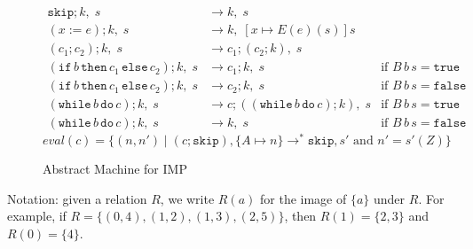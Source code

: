 \documentclass{tufte-handout}
\newcommand{\ASSIGN}[2]{#1 \mathrel{:=} #2}
\newcommand{\SEQ}[2]{#1 \mathrel{;} #2}
\newcommand{\SKIP}[0]{\mathtt{skip}}
\newcommand{\IF}[3]{\mathtt{if}\,#1\,\mathtt{then}\,#2\,\mathtt{else}\,#3}
\newcommand{\WHILE}[2]{\mathtt{while}\,#1\,\mathtt{do}\,#2}
\newcommand{\TRUE}[0]{\mathtt{true}}
\newcommand{\FALSE}[0]{\mathtt{false}}
\begin{document}
\begin{figure*}

\hfill {}
\begin{align*}
  \SEQ{\SKIP}{k},\; s & \longrightarrow k,\; s \\
  \SEQ{(\ASSIGN{x}{e})}{k},\; s & \longrightarrow k,\; [x\mapsto E(e)(s)]s\\
  \SEQ{(\SEQ{c_1}{c_2})}{k},\; s & \longrightarrow
      \SEQ{c_1}{(\SEQ{c_2}{k})},\; s \\
  \SEQ{(\IF{b}{c_1}{c_2})}{k},\; s & \longrightarrow \SEQ{c_1}{k},\; s
     & \text{if } B\,b\,s = \TRUE \\
  \SEQ{(\IF{b}{c_1}{c_2})}{k},\; s & \longrightarrow \SEQ{c_2}{k},\; s
     & \text{if } B\,b\,s = \FALSE \\
  \SEQ{(\WHILE{b}{c})}{k},\; s & \longrightarrow
      \SEQ{c}{(\SEQ{(\WHILE{b}{c})}{k})},\; s
    & \text{if } B\,b\,s = \TRUE \\
  \SEQ{(\WHILE{b}{c})}{k},\; s & \longrightarrow k,\; s
    & \text{if } B\,b\,s = \FALSE 
\end{align*}
\[
  \mathit{eval}(c) = \{ (n,n') \mid
     (\SEQ{c}{\SKIP}), \{A\mapsto n\}
     \longrightarrow^{*} \SKIP, s'
     \text{ and } n' = s'(Z) \}
\]
\caption{Abstract Machine for IMP}
\label{fig:imp-impl}
\end{figure*}

Notation: given a relation $R$, we write $R(a)$ for the image of
$\{a\}$ under $R$. For example, if $R=\{ (0,4), (1,2), (1,3), (2,5)
\}$, then $R(1) = \{2,3\}$ and $R(0) = \{4\}$.
\end{document}
